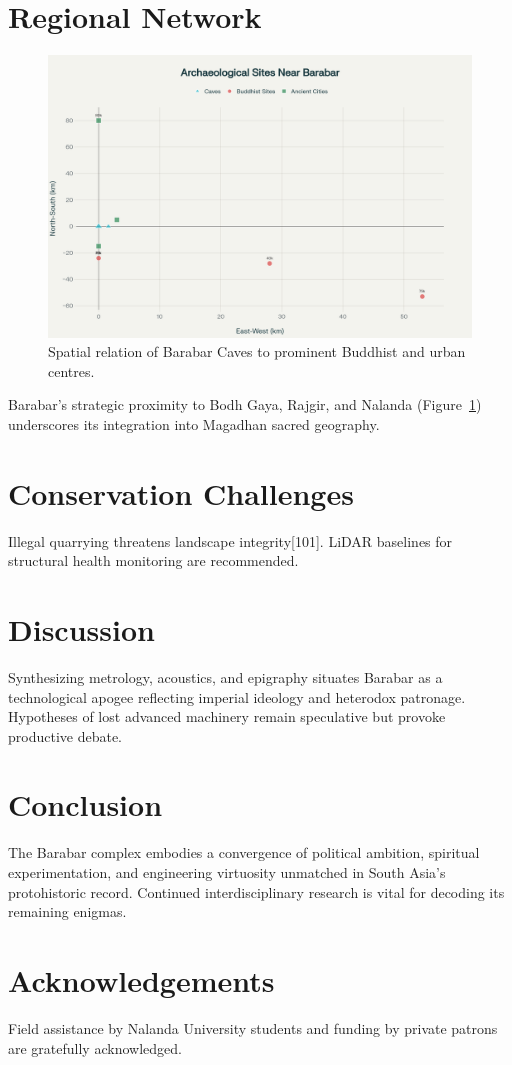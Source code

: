 \documentclass{article}
\begin{document}
\begin{multicols}{2}
\section{Regional Network}
\begin{figure}
\centering
\includegraphics[width=\columnwidth]{archaeological_sites_map.png}
\caption{Spatial relation of Barabar Caves to prominent Buddhist and urban centres.}
\label{fig:map}
\end{figure}
Barabar’s strategic proximity to Bodh Gaya, Rajgir, and Nalanda (Figure~\ref{fig:map}) underscores its integration into Magadhan sacred geography.
\section{Conservation Challenges}
Illegal quarrying threatens landscape integrity[101]. LiDAR baselines for structural health monitoring are recommended.
\section{Discussion}
Synthesizing metrology, acoustics, and epigraphy situates Barabar as a technological apogee reflecting imperial ideology and heterodox patronage. Hypotheses of lost advanced machinery remain speculative but provoke productive debate.
\section{Conclusion}
The Barabar complex embodies a convergence of political ambition, spiritual experimentation, and engineering virtuosity unmatched in South Asia’s protohistoric record. Continued interdisciplinary research is vital for decoding its remaining enigmas.
\section*{Acknowledgements}
Field assistance by Nalanda University students and funding by private patrons are gratefully acknowledged.

\end{multicols}
\end{document}

